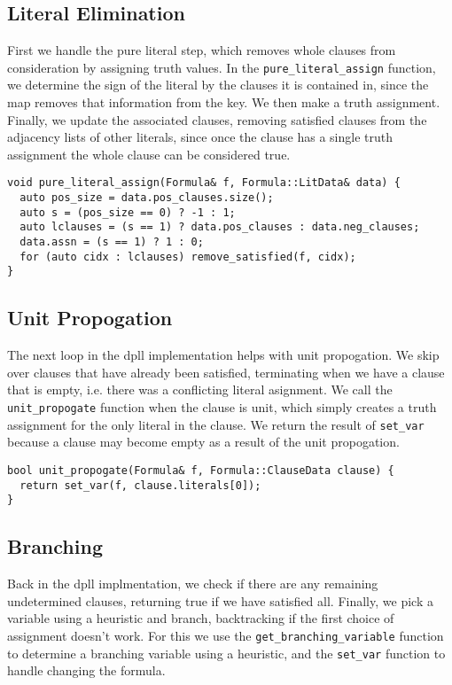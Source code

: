 \documentclass[10pt,AMS Euler]{article}
\begin{document}
\subsection*{Literal Elimination}
\label{sec:orgf1ddb12}
First we handle the pure literal step, which removes whole clauses from
consideration by assigning truth values. In the \texttt{pure\_literal\_assign}
function, we determine the sign of the literal by the clauses it is
contained in, since the map removes that information from the key.
We then make a truth assignment. Finally, we update the associated clauses,
removing satisfied clauses from the adjacency lists of other literals,
since once the clause has a single truth assignment the whole clause can
be considered true.
\begin{verbatim}
void pure_literal_assign(Formula& f, Formula::LitData& data) {
  auto pos_size = data.pos_clauses.size();
  auto s = (pos_size == 0) ? -1 : 1;
  auto lclauses = (s == 1) ? data.pos_clauses : data.neg_clauses;
  data.assn = (s == 1) ? 1 : 0;
  for (auto cidx : lclauses) remove_satisfied(f, cidx);
}
\end{verbatim}

\subsection*{Unit Propogation}
\label{sec:org39501d7}
The next loop in the dpll implementation helps with unit propogation.
We skip over clauses that have already been satisfied, terminating when we
have a clause that is empty, i.e. there was a conflicting literal asignment.
We call the \texttt{unit\_propogate} function when the clause is unit, which
simply creates a truth assignment for the only literal in the clause.
We return the result of \texttt{set\_var} because a clause may become empty as a result
of the unit propogation.
\begin{verbatim}
bool unit_propogate(Formula& f, Formula::ClauseData clause) {
  return set_var(f, clause.literals[0]);
}
\end{verbatim}

\subsection*{Branching}
\label{sec:org6ffa496}
Back in the dpll implmentation, we check if there are any remaining undetermined
clauses, returning true if we have satisfied all. Finally, we pick a
variable using a heuristic and branch, backtracking if the first choice of
assignment doesn't work. For this we use the \texttt{get\_branching\_variable} function
to determine a branching variable using a heuristic, and the \texttt{set\_var}
function to handle changing the formula.
\end{document}
